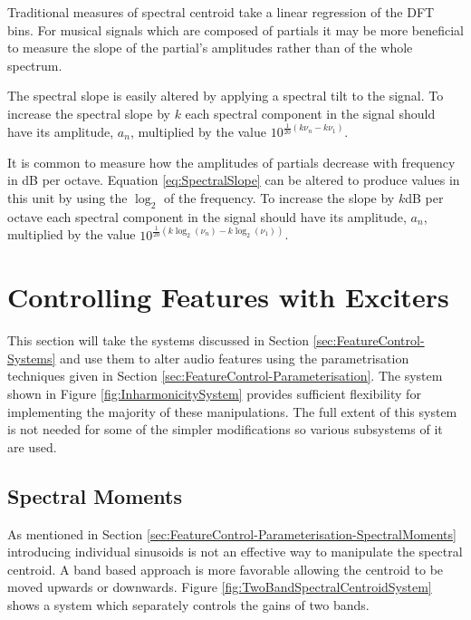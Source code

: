 		Traditional measures of spectral centroid take a linear regression of the DFT bins. For musical signals
		which are composed of partials it may be more beneficial to measure the slope of the partial's amplitudes
		rather than of the whole spectrum. 
		
		The spectral slope is easily altered by applying a spectral tilt to the signal. To increase the spectral
		slope by $k$ each spectral component in the signal should have its amplitude, $a_{n}$, multiplied by the
		value $10^{\frac{1}{20}(k\nu_{n} - k\nu_{1})}$.

		It is common to measure how the amplitudes of partials decrease with frequency in dB per octave. Equation
		\ref{eq:SpectralSlope} can be altered to produce values in this unit by using the $\log_{2}$ of the
		frequency. To increase the slope by $k$dB per octave each spectral component in the signal should have its
		amplitude, $a_{n}$, multiplied by the value $10^{\frac{1}{20}(k\log_{2}(\nu_{n}) - k\log_{2}(\nu_{1}))}$.

\section{Controlling Features with Exciters}
\label{sec:FeatureControl-Control}
	This section will take the systems discussed in Section \ref{sec:FeatureControl-Systems} and use them to alter
	audio features using the parametrisation techniques given in Section \ref{sec:FeatureControl-Parameterisation}.
	The system shown in Figure \ref{fig:InharmonicitySystem} provides sufficient flexibility for implementing the
	majority of these manipulations. The full extent of this system is not needed for some of the simpler modifications
	so various subsystems of it are used.

	\subsection{Spectral Moments}
	\label{sec:FeatureControl-Control-SpectralMoments}
		As mentioned in Section \ref{sec:FeatureControl-Parameterisation-SpectralMoments} introducing individual
		sinusoids is not an effective way to manipulate the spectral centroid. A band based approach is more
		favorable allowing the centroid to be moved upwards or downwards. Figure
		\ref{fig:TwoBandSpectralCentroidSystem} shows a system which separately controls the gains of two bands.

